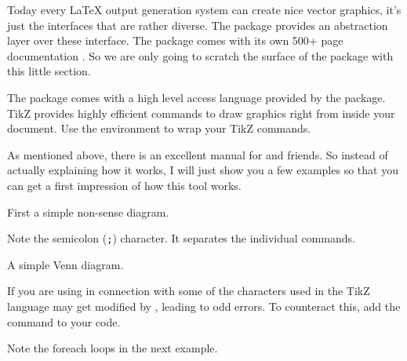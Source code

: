 Today every \LaTeX{} output generation system can create nice vector graphics,
it's just the interfaces that are rather diverse. The  package provides an
abstraction layer over these interface. The
 package comes with its own 500+ page documentation
\cite{pgfplot}. So we are only going to scratch the surface of the package with this little
section.

The  package comes with a high level access language provided by the   package.
TikZ provides highly efficient commands to
draw graphics right from inside your document. Use the 
environment to wrap your TikZ commands.

As mentioned above, there is an excellent manual for  and friends. So
instead of actually explaining how it works, I will just show you a few examples
so that you can get a first impression of how this tool works.

First a simple non-sense diagram.
\begin{example}
\end{example}
Note the semicolon (\texttt{;}) character. It separates the individual commands.

A simple Venn diagram.
\begin{example}
\shorthandoff{:}
\end{example}
If you are using  in connection with  some of the characters used in the
TikZ language may get modified by , leading to odd errors. To counteract this, add 
the  command to your code.

Note the foreach loops in the next example.
\begin{example}
\end{example}

